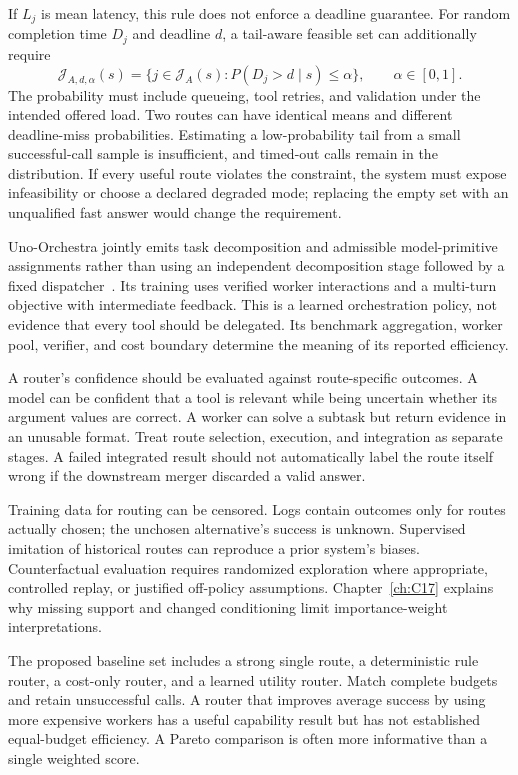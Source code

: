 If $L_j$ is mean latency, this rule does not enforce a deadline guarantee. For random completion time $D_j$ and deadline $d$, a tail-aware feasible set can additionally require
\begin{equation}
 \mathcal J_{A,d,\alpha}(s)=
 \{j\in\mathcal J_A(s):P(D_j>d\mid s)\leq\alpha\},
 \qquad \alpha\in[0,1].
\end{equation}
The probability must include queueing, tool retries, and validation under the intended offered load. Two routes can have identical means and different deadline-miss probabilities. Estimating a low-probability tail from a small successful-call sample is insufficient, and timed-out calls remain in the distribution. If every useful route violates the constraint, the system must expose infeasibility or choose a declared degraded mode; replacing the empty set with an unqualified fast answer would change the requirement.

Uno-Orchestra jointly emits task decomposition and admissible model-primitive assignments rather than using an independent decomposition stage followed by a fixed dispatcher~\cite{cui2026unoorchestra}. Its training uses verified worker interactions and a multi-turn objective with intermediate feedback. This is a learned orchestration policy, not evidence that every tool should be delegated. Its benchmark aggregation, worker pool, verifier, and cost boundary determine the meaning of its reported efficiency.

A router's confidence should be evaluated against route-specific outcomes. A model can be confident that a tool is relevant while being uncertain whether its argument values are correct. A worker can solve a subtask but return evidence in an unusable format. Treat route selection, execution, and integration as separate stages. A failed integrated result should not automatically label the route itself wrong if the downstream merger discarded a valid answer.

Training data for routing can be censored. Logs contain outcomes only for routes actually chosen; the unchosen alternative's success is unknown. Supervised imitation of historical routes can reproduce a prior system's biases. Counterfactual evaluation requires randomized exploration where appropriate, controlled replay, or justified off-policy assumptions. Chapter~\ref{ch:C17} explains why missing support and changed conditioning limit importance-weight interpretations.

The proposed baseline set includes a strong single route, a deterministic rule router, a cost-only router, and a learned utility router. Match complete budgets and retain unsuccessful calls. A router that improves average success by using more expensive workers has a useful capability result but has not established equal-budget efficiency. A Pareto comparison is often more informative than a single weighted score.

